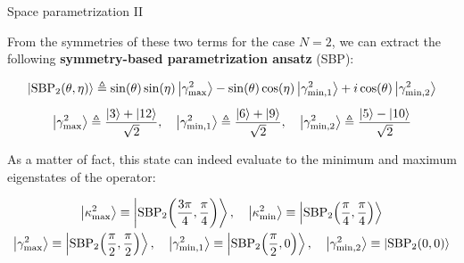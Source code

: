\documentclass[9pt, handout, aspectratio=169]{beamer}	%
\begin{document}
\begin{frame}{Space parametrization II}

	From the symmetries of these two terms for the case $N=2$, we can extract the following \textbf{symmetry-based parametrization ansatz} (SBP):

	\begin{gather*}
	  \ket{\text{SBP}_{2} \qty(\theta, \eta)} \defeq
	    \sin(\theta)\sin(\eta) \ket{\gamma_{\text{max}}^2} -
	    \sin(\theta)\cos(\eta) \ket{\gamma_{\text{min},1}^2} + i
	    \cos(\theta) \ket{\gamma_{\text{min},2}^2} \\[5pt]
	  \ket{\gamma_{\text{max}}^2} \defeq
	    \frac{\ket{3}+\ket{12}}{\sqrt{2}} \qc
	  \ket{\gamma_{\text{min},1}^2} \defeq
	    \frac{\ket{6}+\ket{9}}{\sqrt{2}} \qc
	  \ket{\gamma_{\text{min},2}^2} \defeq
	    \frac{\ket{5} - \ket{10}}{\sqrt{2}}
	\end{gather*}

	\vspace{1em}

	As a matter of fact, this state can indeed evaluate to the minimum and maximum eigenstates of the operator:

	\begin{gather*}
	  \ket{\kappa_{\text{max}}^{2}} \equiv
	    \ket{\text{SBP}_{2} \qty(\frac{3\pi}{4}, \frac{\pi}{4})} \qc
	  \ket{\kappa_{\text{min}}^{2}} \equiv
	    \ket{\text{SBP}_{2} \qty(\frac{\pi}{4}, \frac{\pi}{4})} \\
	  \ket{\gamma_{\text{max}}^{2}} \equiv
	    \ket{\text{SBP}_{2} \qty(\frac{\pi}{2}, \frac{\pi}{2})} \qc
	  \ket{\gamma_{\text{min},1}^{2}} \equiv
	    \ket{\text{SBP}_{2} \qty(\frac{\pi}{2}, 0)} \qc
	  \ket{\gamma_{\text{min},2}^{2}} \equiv
	    \ket{\text{SBP}_{2} \qty(0, 0)}
	\end{gather*}

\end{frame}

\end{document}
